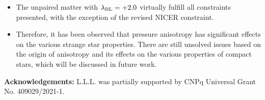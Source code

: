 \documentclass[%
reprint,
superscriptaddress,
nofootinbib,
amsmath,
amssymb,
aps,
floatfix,
showkeys,
]{revtex4-2}
\begin{document}
\begin{itemize}
     \item The unpaired matter with $\lambda_{\rm BL} = +2.0$ virtually fulfill all constraints presented, with the exception of the revised NICER constraint.

     \item Therefore, it has been observed that pressure anisotropy has significant effects on the various strange star properties. There are still unsolved issues based on the origin of anisotropy and its effects on the various properties of compact stars, which will be discussed in future work.
     
\end{itemize}





\textbf{Acknowledgements:} L.L.L. was partially supported by CNPq Universal Grant No. 409029/2021-1.

\newpage


%
\end{document}
